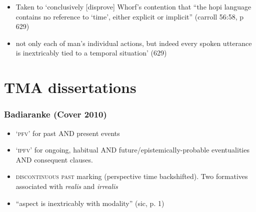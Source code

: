 \documentclass[10pt]{article}
\begin{document}
\begin{itemize}
	\item Taken to `conclusively [disprove] Whorf's contention that ``the hopi language contains no reference to `time', either explicit or implicit'' (carroll 56:58, p 629)
	\item not only each of man's individual actions, but indeed every spoken utterance is inextricably tied to a temporal situation' (629)
\end{itemize}

\part{TMA dissertations}
\section{Badiaranke (Cover 2010)}
\begin{itemize}
	\item `\textsc{pfv}' for past AND present events
	\item `\textsc{ipfv}' for ongoing, habitual AND future/epistemically-probable eventualities AND consequent clauses.
	\item \textsc{discontinuous past} marking (perspective time backshifted). Two formatives associated with \textit{realis} and \textit{irrealis}
	\item ``aspect is inextricably with modality'' (sic, p. 1) 
\end{itemize}
\end{document}
